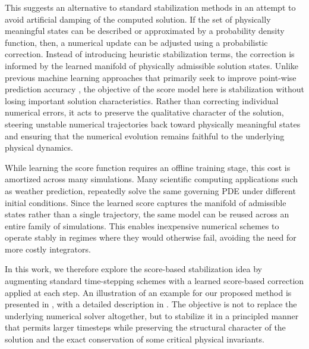 \documentclass[letterpaper]{article} %
\begin{document}
This suggests an alternative to standard stabilization methods in an attempt to avoid artificial damping of the computed solution. If the set of physically meaningful states can be described or approximated by a probability density function, then, a numerical update can be adjusted using a probabilistic correction. Instead of introducing heuristic stabilization terms, the correction is informed by the learned manifold of physically admissible solution states. 
Unlike previous machine learning approaches that primarily seek to improve point-wise prediction accuracy \citep{kochkov2021machine, bar2019learning}, the objective of the score model here is stabilization without losing important solution characteristics. Rather than correcting individual numerical errors, it acts to preserve the qualitative character of the solution, steering unstable numerical trajectories back toward physically meaningful states and ensuring that the numerical evolution remains faithful to the underlying physical dynamics.


While learning the score function requires an offline training stage,
this cost is amortized across many simulations. Many scientific computing
applications such as weather prediction, repeatedly solve the same governing PDE under different
initial conditions. Since the learned score
captures the manifold of admissible states rather than a single trajectory,
the same model can be reused across an entire family of simulations.
This enables inexpensive numerical schemes to operate stably in regimes
where they would otherwise fail, avoiding the need for more costly
integrators.


In this work, we therefore explore the score-based stabilization idea by augmenting standard time-stepping schemes with a learned score-based correction applied at each step. An illustration of an example for our proposed method is presented in , with a detailed description in . The objective is not to replace the underlying numerical solver altogether, but to stabilize it in a principled manner that permits larger timesteps while preserving the structural character of the solution and the exact conservation of some critical physical invariants.
\end{document}

